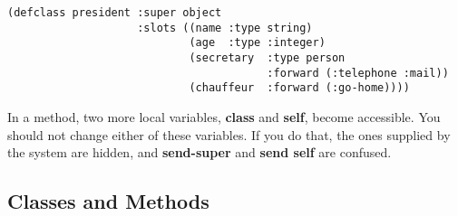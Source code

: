 \begin{verbatim}
(defclass president :super object
                    :slots ((name :type string)
                            (age  :type :integer)
                            (secretary  :type person
                                        :forward (:telephone :mail))
                            (chauffeur  :forward (:go-home))))
\end{verbatim}

In a method, two more local variables,
{\bf class} and {\bf self}, become accessible.
You should not change either of these variables.
If you do that, the ones supplied by the system are hidden,
and {\bf send-super} and {\bf send self} are confused.


\subsection{Classes and Methods}

